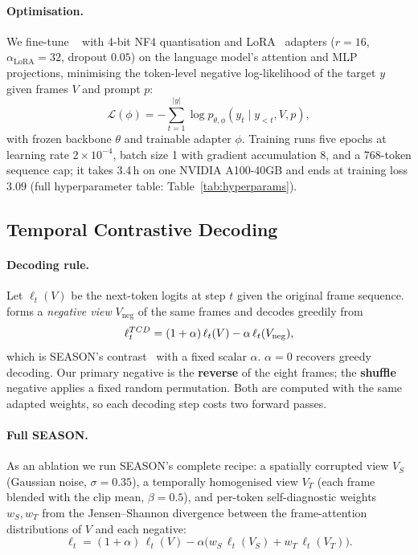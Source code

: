 \paragraph{Optimisation.}
We fine-tune ~\cite{qwen25vl} with 4-bit NF4 quantisation and LoRA~\cite{lora,qlora} adapters ($r{=}16$, $\alpha_{\mathrm{LoRA}}{=}32$, dropout $0.05$) on the language model's attention and MLP projections, minimising the token-level negative log-likelihood of the target $y$ given frames $V$ and prompt $p$:
\begin{equation}
\mathcal{L}(\phi)=-\sum_{t=1}^{|y|}\log p_{\theta,\phi}\!\left(y_t\mid y_{<t},V,p\right),
\label{eq:sft}
\end{equation}
with frozen backbone $\theta$ and trainable adapter $\phi$.
Training runs five epochs at learning rate $2{\times}10^{-4}$, batch size 1 with gradient accumulation 8, and a 768-token sequence cap; it takes 3.4\,h on one NVIDIA A100-40GB and ends at training loss $3.09$ (full hyperparameter table: Table~\ref{tab:hyperparams}).

\subsection{Temporal Contrastive Decoding}
\label{sec:tcd}

\paragraph{Decoding rule.}
Let $\ell_t(V)$ be the next-token logits at step $t$ given the original frame sequence.
\tcd{} forms a \emph{negative view} $V_{\mathrm{neg}}$ of the same frames and decodes greedily from
\begin{equation}
\ell_t^{TCD}=(1+\alpha)\,\ell_t(V)-\alpha\,\ell_t(V_{\mathrm{neg}}),
\label{eq:tcd}
\end{equation}
which is SEASON's contrast~\cite{season2025} with a fixed scalar $\alpha$.
$\alpha{=}0$ recovers greedy decoding.
Our primary negative is the \textbf{reverse} of the eight frames; the \textbf{shuffle} negative applies a fixed random permutation.
Both are computed with the same adapted weights, so each decoding step costs two forward passes.

\paragraph{Full SEASON.}
As an ablation we run SEASON's complete recipe: a spatially corrupted view $V_S$ (Gaussian noise, $\sigma{=}0.35$), a temporally homogenised view $V_T$ (each frame blended with the clip mean, $\beta{=}0.5$), and per-token self-diagnostic weights $w_S,w_T$ from the Jensen--Shannon divergence between the frame-attention distributions of $V$ and each negative:
\begin{equation}
\ell_t=(1+\alpha)\,\ell_t(V)-\alpha\bigl(w_S\,\ell_t(V_S)+w_T\,\ell_t(V_T)\bigr).
\label{eq:fullseason}
\end{equation}

